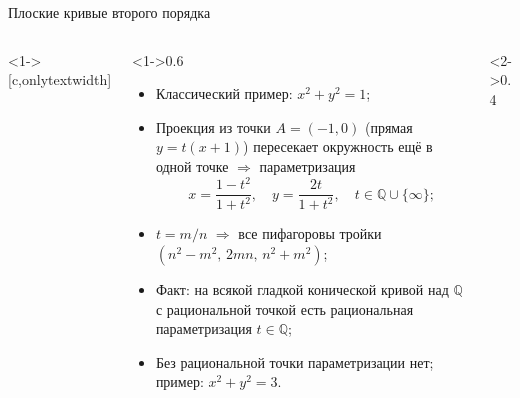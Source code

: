 \documentclass[serif, aspectratio=169]{beamer}
\newcommand{\sagemark}{%
  \textcolor{green!40!black}{\textbf{\texttt{sage:...}}}%
}
\begin{document}
\begin{frame}{Плоские кривые второго порядка}
    \begin{columns}<1->[c,onlytextwidth]
        \begin{column}<1->{0.6\textwidth}
    \begin{itemize}
        \item Классический пример: $x^2+y^2=1$;
        \item Проекция из точки $A=(-1,0)$ (прямая $y=t(x+1)$) пересекает окружность ещё в одной точке $\Rightarrow$ параметризация
        \[x=\frac{1-t^2}{1+t^2},\quad y=\frac{2t}{1+t^2},\quad t\in\mathbb{Q}\cup\{\infty\};\]
        \item $t=m/n$ $\Rightarrow$ все пифагоровы тройки $(n^2-m^2,\,2mn,\,n^2+m^2)$;
        \item Факт: на всякой гладкой конической кривой над $\mathbb{Q}$ с рациональной точкой есть рациональная параметризация $t\in\mathbb{Q}$;
        \item Без рациональной точки параметризации нет; пример: $x^2+y^2=3$.
    \end{itemize}
        \end{column}
        \begin{column}<2->{0.4\textwidth}
            \begin{center}
            \end{center}
        \end{column}
    \end{columns}
    \note{
        \begin{itemize}
            \item ---
        \end{itemize}
    }
\end{frame}
\end{document}
